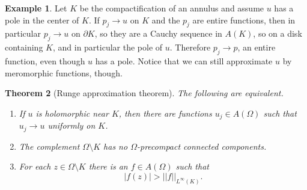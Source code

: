 \documentclass[12pt]{report}
\newtheorem{theorem}{Theorem}[chapter]
\theoremstyle{definition}
\newtheorem{example}[theorem]{Example}
\begin{document}
\begin{example}
    Let $K$ be the compactification of an annulus and assume $u$ has a pole in the center of $K$. If $p_j \to u$ on $K$ and the $p_j$ are entire functions, then in particular $p_j \to u$ on $\partial K$, so they are a Cauchy sequence in $A(K)$, so on a disk containing $K$, and in particular the pole of $u$. Therefore $p_j \to p$, an entire function, even though $u$ has a pole. Notice that we can still approximate $u$ by meromorphic functions, though.
\end{example}
\begin{theorem}[Runge approximation theorem]
    The following are equivalent.
\begin{enumerate}
    \item If $u$ is holomorphic near $K$, then there are functions $u_j \in A(\Omega)$ such that $u_j \to u$ uniformly on $K$.
    \item The complement $\Omega \setminus K$ has no $\Omega$-precompact connected components.
    \item For each $z \in \Omega \setminus K$ there is an $f \in A(\Omega)$ such that
    $$|f(z)| > ||f||_{L^\infty(K)}.$$
\end{enumerate}
\end{theorem}
\end{document}
